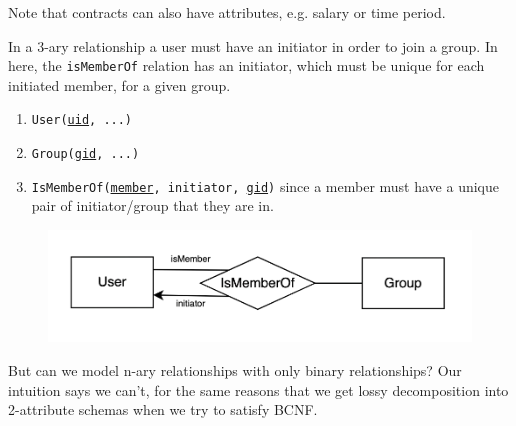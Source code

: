 \begin{example}
\begin{figure}[H]
        \caption{} 
        \label{fig:four_ary}
      \end{figure}
      Note that contracts can also have attributes, e.g. salary or time period. 
    \end{example}

    \begin{example}
      In a 3-ary relationship a user must have an initiator in order to join a group. In here, the \texttt{isMemberOf} relation has an initiator, which must be unique for each initiated member, for a given group. 
      \begin{enumerate}
        \item \texttt{User(\underline{uid}, ...)} 
        \item \texttt{Group(\underline{gid}, ...)} 
        \item \texttt{IsMemberOf(\underline{member}, initiator, \underline{gid})} since a member must have a unique pair of initiator/group that they are in. 
      \end{enumerate}
      \begin{figure}[H]
        \centering 
        \includegraphics[scale=0.3]{img/three_ary.png}
        \caption{} 
        \label{fig:three_ary}
      \end{figure}
    \end{example}

    But can we model n-ary relationships with only binary relationships? Our intuition says we can't, for the same reasons that we get lossy decomposition into 2-attribute schemas when we try to satisfy BCNF. 

